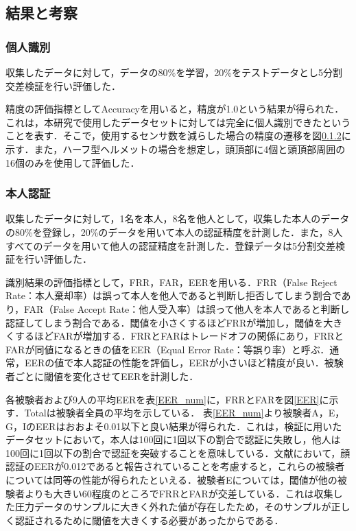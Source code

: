 \documentclass[Japanese,noauthor]{dicomopapers}
\begin{document}
\subsection{結果と考察}
\subsubsection{個人識別}
収集したデータに対して，データの80\%を学習，20\%をテストデータとし5分割交差検証を行い評価した．\par

精度の評価指標としてAccuracyを用いると，精度が1.0という結果が得られた．これは，本研究で使用したデータセットに対しては完全に個人識別できたということを表す．そこで，使用するセンサ数を減らした場合の精度の遷移を図\ref{}に示す．また，ハーフ型ヘルメットの場合を想定し，頭頂部に4個と頭頂部周囲の16個のみを使用して評価した．


\subsubsection{本人認証}
収集したデータに対して，1名を本人，8名を他人として，収集した本人のデータの80\%を登録し，20\%のデータを用いて本人の認証精度を計測した．また，8人すべてのデータを用いて他人の認証精度を計測した．登録データは5分割交差検証を行い評価した．\par

識別結果の評価指標として，FRR，FAR，EERを用いる．FRR（False Reject Rate：本人棄却率）は誤って本人を他人であると判断し拒否してしまう割合であり，FAR（False Accept Rate：他人受入率）は誤って他人を本人であると判断し認証してしまう割合である．閾値を小さくするほどFRRが増加し，閾値を大きくするほどFARが増加する．FRRとFARはトレードオフの関係にあり，FRRとFARが同値になるときの値をEER（Equal Error Rate：等誤り率）と呼ぶ．通常，EERの値で本人認証の性能を評価し，EERが小さいほど精度が良い．被験者ごとに閾値を変化させてEERを計測した．\par

各被験者および9人の平均EERを表\ref{EER_num}に，FRRとFARを図\ref{EER}に示す．Totalは被験者全員の平均を示している．
表\ref{EER_num}より被験者A，E，G，IのEERはおおよそ0.01以下と良い結果が得られた．これは，検証に用いたデータセットにおいて，本人は100回に1回以下の割合で認証に失敗し，他人は100回に1回以下の割合で認証を突破することを意味している．文献\cite{face_auth}において，顔認証のEERが0.012であると報告されていることを考慮すると，これらの被験者については同等の性能が得られたといえる．被験者Eについては，閾値が他の被験者よりも大きい60程度のところでFRRとFARが交差している．これは収集した圧力データのサンプルに大きく外れた値が存在したため，そのサンプルが正しく認証されるために閾値を大きくする必要があったからである．\par
\end{document}
